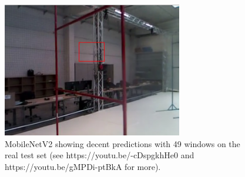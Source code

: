 \begin{figure}[h]
    \centering
    \includegraphics[width=0.7\textwidth]{figure/good_test_res.png}
    \caption[MobileNetV2 showing decent results]{MobileNetV2 showing decent
    predictions with 49 windows on the real test set (see
    https://youtu.be/-cDspgkhHe0 and https://youtu.be/gMPDi-ptBkA for more).}
    \label{fig:good-test}
\end{figure}
